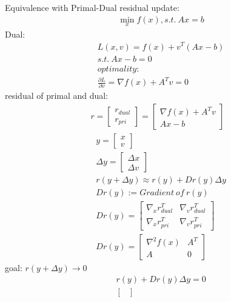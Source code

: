 \documentclass[8pt]{report}
\begin{document}
\begin{multicols*}{2}
  Equivalence with Primal-Dual residual update:
  \begin{align*}
    &\min_x f(x), s.t.\ Ax=b
  \end{align*}
  Dual:
  \begin{align*}
    &L(x,v) = f(x) + v^T(Ax-b)\\
    &s.t.\ Ax-b=0\\
    &optimality:\\
    &\frac{\partial L}{\partial v} = \nabla f(x) + A^Tv = 0
  \end{align*}
  residual of primal and dual:
  \begin{align*}
    r=\begin{bmatrix}
      r_{dual}\\
      r_{pri}
    \end{bmatrix}
    =\begin{bmatrix}
      \nabla f(x) + A^Tv\\
      Ax-b
    \end{bmatrix}
  \end{align*}
  \begin{align*}
    &y =
    \begin{bmatrix}
      x\\ v
    \end{bmatrix}\\
    &\Delta y =
    \begin{bmatrix}
      \Delta x\\ \Delta v
    \end{bmatrix}\\
    &r(y+\Delta y) \approx r(y) + Dr(y) \Delta y\\
    &Dr(y):=Gradient\ of\ r(y)\\
    &Dr(y) =
      \begin{bmatrix}
        \nabla_x r_{dual}^T & \nabla_v r_{dual}^T\\
        \nabla_x r_{pri}^T & \nabla_v r_{pri}^T
      \end{bmatrix}\\
    &Dr(y) =
      \begin{bmatrix}
        \nabla^2 f(x) & A^T\\
        A & 0
      \end{bmatrix}                             
  \end{align*}
  goal: $r(y+\Delta y) \to 0$
  \vfill\null
  \pagebreak
  \begin{align*}
    &r(y) + Dr(y) \Delta y = 0\\
    &\begin{bmatrix}

\end{bmatrix}
\end{align*}
\end{multicols*}
\end{document}
